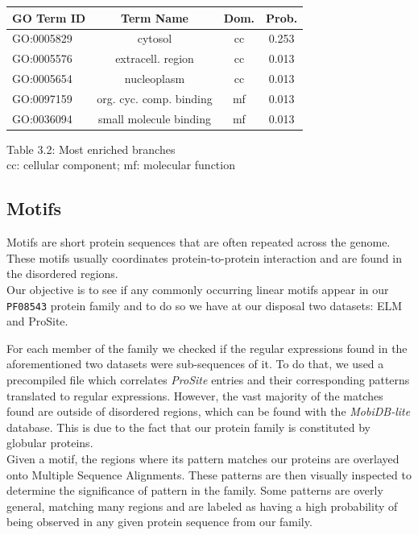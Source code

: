\documentclass[10pt,twocolumn,letterpaper]{article}
\begin{document}
\begin{center}
    \begin{tabular}{lccc}
        \toprule
        GO Term ID & Term Name & Dom. & Prob. \\
        \midrule
        GO:0005829	& \small{cytosol} & cc & 0.253 \\
        GO:0005576	& \small{extracell. region} & cc & 0.013 \\
        GO:0005654	& \small{nucleoplasm} &	cc & 0.013 \\
        GO:0097159	& \small{org. cyc. comp. binding} & mf	& 0.013 \\
        GO:0036094	& \small{small molecule binding} & mf & 0.013 \\
        \bottomrule
    \end{tabular}
\end{center} 
\begin{center}
    \small{Table 3.2: Most enriched branches}\\
    \small{cc: cellular component; mf: molecular function}\\
    
\end{center}



\subsection{Motifs}
Motifs are short protein sequences that are often repeated across the genome. These motifs usually coordinates protein-to-protein interaction and are found in the disordered regions. \\

Our objective is to see if any commonly occurring linear motifs appear in our \texttt{PF08543} protein family and to do so we have at our disposal two datasets: ELM and ProSite.

For each member of the family we checked if the regular expressions found in the aforementioned two datasets were sub-sequences of it. To do that, we used a precompiled file\cite{prosite_regex} which correlates \textit{ProSite} entries and their corresponding patterns translated to regular expressions. However, the vast majority of the matches found are outside of disordered regions, which can be found with the \textit{MobiDB-lite} database. This is due to the fact that our protein family is constituted by globular proteins.\\

Given a motif, the regions where its pattern matches our proteins are overlayed onto Multiple Sequence Alignments. These patterns are then visually inspected to determine the significance of pattern in the family.
Some patterns are overly general, matching many regions and are labeled as having a high probability of being observed in any given protein sequence from our family.
\end{document}
